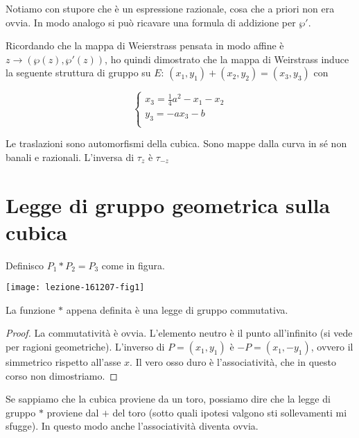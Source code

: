 Notiamo con stupore che è un espressione razionale, cosa che a priori non era ovvia.
In modo analogo si può ricavare una formula di addizione per $\wp'$.

\begin{osservazione}
Ricordando che la mappa di Weierstrass pensata in modo affine è $z \rightarrow (\wp(z),\wp'(z))$, ho quindi dimostrato che la mappa di Weirstrass induce la seguente struttura di gruppo su $E$:
$(x_1,y_1) + (x_2,y_2) = (x_3,y_3)$ con

\begin{displaymath}
  \left\{
    \begin{array}{l}
      x_3 = \frac14 a^2 - x_1 - x_2 \\
      y_3 = - ax_3 - b \\
    \end{array}
  \right.
\end{displaymath}
\end{osservazione}

\begin{osservazione}
Le traslazioni sono automorfismi della cubica. Sono mappe dalla curva in sé non banali e razionali.
L'inversa di $\tau_z$ è $\tau_{-z}$
\end{osservazione}

\section{Legge di gruppo geometrica sulla cubica}
Definisco $P_1 * P_2 = P_3$ come in figura.
\begin{center}
  \texttt{[image: lezione-161207-fig1]}
\end{center}

\begin{proposizione}
La funzione $*$ appena definita è una legge di gruppo commutativa.
\end{proposizione}
\begin{proof}
La commutatività è ovvia.
L'elemento neutro è il punto all'infinito (si vede per ragioni geometriche).
L'inverso di $P = (x_1, y_1)$ è $-P = (x_1, -y_1)$, ovvero il simmetrico rispetto all'asse $x$.
Il vero osso duro è l'associatività, che in questo corso non dimostriamo.
\end{proof}

\begin{osservazione}
Se sappiamo che la cubica proviene da un toro, possiamo dire che la legge di gruppo $*$ proviene dal $+$ del toro (sotto quali ipotesi valgono sti sollevamenti mi sfugge). In questo modo anche l'associatività diventa ovvia.
\end{osservazione}

